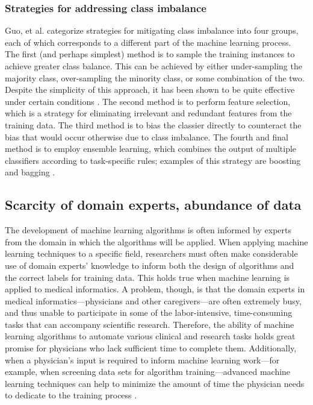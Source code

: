 \documentclass[12pt]{article} %
\begin{document}
\subsubsection{Strategies for addressing class imbalance}
Guo, et al. \cite{guo2008} categorize strategies for mitigating class imbalance into four groups, each of which corresponds to a different part of the machine learning process.
The first (and perhaps simplest) method is to sample the training instances to achieve greater class balance.
This can be achieved by either under-sampling the majority class, over-sampling the minority class, or some combination of the two.
Despite the simplicity of this approach, it has been shown to be quite effective under certain conditions \cite{japkowicz2000}.
The second method is to perform feature selection, which is a strategy for eliminating irrelevant and redundant features from the training data.
The third method is to bias the classier directly to counteract the bias that would occur otherwise due to class imbalance.
The fourth and final method is to employ ensemble learning, which combines the output of multiple classifiers according to task-specific rules; examples of this strategy are boosting and bagging \cite{guo2008}.


\subsection{Scarcity of domain experts, abundance of data}
The development of machine learning algorithms is often informed by experts from the domain in which the algorithms will be applied. When applying machine learning techniques to a specific field, researchers must often make considerable use of domain experts' knowledge to inform both the design of algorithms and the correct labels for training data.
This holds true when machine learning is applied to medical informatics.
A problem, though, is that the domain experts in medical informatics---physicians and other caregivers---are often extremely busy, and thus unable to participate in some of the labor-intensive, time-consuming tasks that can accompany scientific research.
Therefore, the ability of machine learning algorithms to automate various clinical and research tasks holds great promise for physicians who lack sufficient time to complete them. Additionally, when a physician's input is required to inform machine learning work---for example, when screening data sets for algorithm training---advanced machine learning techniques can help to minimize the amount of time the physician needs to dedicate to the training process \cite{wallace2012}.
\end{document}
